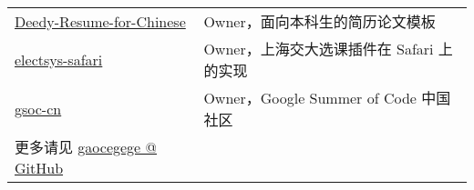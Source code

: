 \documentclass[]{deedy-resume-openfont}
\begin{document}
\begin{minipage}[t]{0.68\textwidth}
\begin{tabular}{ll}
\href{https://github.com/dyweb/Deedy-Resume-for-Chinese}{Deedy-Resume-for-Chinese} & Owner，面向本科生的简历论文模板 \\
\href{https://github.com/dyweb/electsys-safari}{electsys-safari} & Owner，上海交大选课插件在 Safari 上的实现 \\
\href{https://github.com/gsoc-cn/gsoc-cn}{gsoc-cn} & Owner，Google Summer of Code 中国社区 \\
更多请见 \href{https://github.com/gaocegege}{gaocegege @ GitHub} & \\
\end{tabular}
\sectionsep

\sectionsep\end{minipage}
\end{document}

